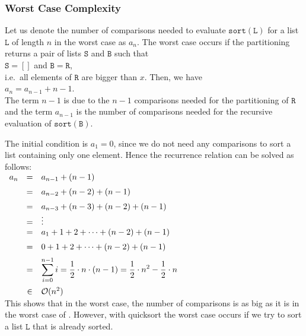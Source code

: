\subsubsection{Worst Case Complexity}
Let us denote the number of comparisons needed to evaluate $\mathtt{sort}(\mathtt{L})$ for a list $\mathtt{L}$ of
length $n$ in the worst case as $a_n$.  The worst case occurs if the partitioning
returns a pair of lists $\mathtt{S}$ and $\mathtt{B}$ such that
\\[0.2cm]
\hspace*{1.3cm}
$\mathtt{S} = []$ and $\mathtt{B} = \mathtt{R}$,
\\[0.2cm]
i.e.~all elements of $\mathtt{R}$ are bigger than $x$.  Then, we have
\\[0.2cm]
\hspace*{1.3cm}
$a_n = a_{n-1} + n - 1$. 
\\[0.2cm]
The term $n-1$ is due to the $n-1$ comparisons needed for the partitioning of $\mathtt{R}$
and the term $a_{n-1}$ is the number of comparisons needed for the recursive evaluation of $\mathtt{sort}(\mathtt{B})$.

The initial condition is $a_1 = 0$, since we do not need any comparisons to sort a list
containing only one element.
Hence the recurrence relation can be solved as follows:
\\[0.2cm]
\hspace*{1.3cm}
$
\begin{array}{lcl}
  a_n & = & a_{n-1} + (n-1) \\[0.2cm]
      & = & a_{n-2} + (n-2) + (n-1) \\[0.2cm]
      & = & a_{n-3} + (n-3) + (n-2) + (n-1) \\
      & = & \vdots \\
      & = & a_{1} + 1 + 2 + \cdots  + (n-2) + (n-1) \\[0.2cm]
      & = & 0 + 1 + 2 + \cdots  + (n-2) + (n-1) \\[0.2cm]
      & = & \displaystyle \sum\limits_{i=0}^{n-1} i  =  \frac{1}{2} \cdot n \cdot(n - 1) =
            \frac{1}{2} \cdot n^2 - \frac{1}{2} \cdot n \\[0.5cm]
      & \in & \mathcal{O}(n^2)
\end{array}
$
\\[0.2cm]
This shows that in the worst case, the number of comparisons is as big as it is in the worst case of 
.  However, with quicksort the worst case occurs if we try to sort a list $\mathtt{L}$ that is
already sorted. 


